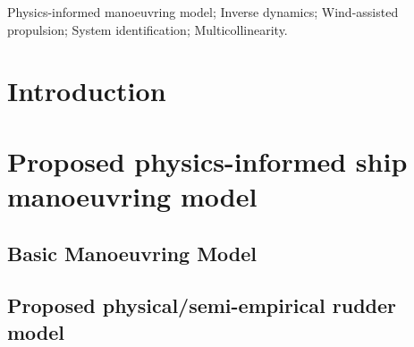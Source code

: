 \documentclass[preprint,12pt,authoryear]{elsarticle}
\begin{document}
\begin{frontmatter}

    \begin{abstract}
        

    \end{abstract}


    \begin{keyword}
    Physics-informed manoeuvring model; Inverse dynamics; Wind-assisted propulsion; System identification;  Multicollinearity.



    \end{keyword}

\end{frontmatter}


\section{Introduction}
\label{sec:introduction}

%
%
%
\section{Proposed physics-informed ship manoeuvring model}
\label{sec:ship_models}

\FloatBarrier
\subsection{Basic Manoeuvring Model}
\label{sec:models}

%
\subsection{Proposed physical/semi-empirical rudder model}
\label{sec:semiempirical_rudder_model}

%
\end{document}
